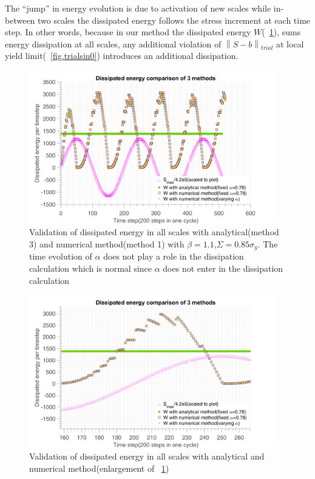 \documentclass[3p,times,procedia,number]{elsarticle}
\newcommand{\figref}[1]{\figurename~\ref{#1}}
\begin{document}
The ``jump'' in energy evolution is due to activation of new scales while in-between two scales the dissipated energy follows the stress increment at each time step. In other words, because in our method the dissipated energy $W$(\figref{fig.W3methods}), sums energy dissipation at all scales, any additional violation of $\left\|S-b \right\|_{trial}$ at local yield limit(\figref{fig.trialsin0}) introduces an additional dissipation. 

\begin{figure}[!h]
	\centering
	\includegraphics[width=0.95\textwidth]{figures//W_3methods.png} 
	\caption{Validation of dissipated energy in all scales with analytical(method 3) and numerical method(method 1) with $\beta=1.1$,$\Sigma=0.85\sigma_y$. The time evolution of $\alpha$ does not play a role in the dissipation calculation which is normal since $\alpha$ does not enter in the dissipation calculation }
	\label{fig.W3methods}
\end{figure}
\begin{figure}[!h]
	\centering
	\includegraphics[width=0.95\textwidth]{figures//W_3methods_enlarge.png} 
	\caption{Validation of dissipated energy in all scales with analytical and numerical method(enlargement of \figref{fig.W3methods})}
	\label{fig.W3methodsenlarge}
\end{figure}
\end{document}
